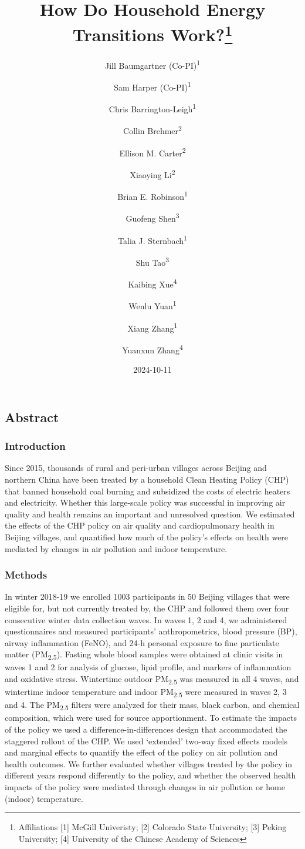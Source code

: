 \documentclass[
  letterpaper,
  DIV=11,
  numbers=noendperiod]{scrartcl}
\title{How Do Household Energy Transitions Work?\thanks{Affiliations
{[}1{]} McGill Univeristy; {[}2{]} Colorado State University; {[}3{]}
Peking University; {[}4{]} University of the Chinese Academy of
Sciences}}
\author{Jill Baumgartner (Co-PI)\textsuperscript{1} \and Sam Harper
(Co-PI)\textsuperscript{1} \and Chris
Barrington-Leigh\textsuperscript{1} \and Collin
Brehmer\textsuperscript{2} \and Ellison M.
Carter\textsuperscript{2} \and Xiaoying Li\textsuperscript{2} \and Brian
E. Robinson\textsuperscript{1} \and Guofeng
Shen\textsuperscript{3} \and Talia J.
Sternbach\textsuperscript{1} \and Shu
Tao\textsuperscript{3} \and Kaibing Xue\textsuperscript{4} \and Wenlu
Yuan\textsuperscript{1} \and Xiang Zhang\textsuperscript{1} \and Yuanxun
Zhang\textsuperscript{4}}
\date{2024-10-11}
\renewcommand*\contentsname{Table of contents}
\newcommand\contentsname{Table of contents}
\begin{document}
\maketitle

\renewcommand*\contentsname{Table of contents}
{
\hypersetup{linkcolor=}
\setcounter{tocdepth}{3}
\tableofcontents
}

\subsection*{Abstract}\label{abstract}

\subsubsection*{Introduction}\label{introduction}

Since 2015, thousands of rural and peri-urban villages across Beijing
and northern China have been treated by a household Clean Heating Policy
(CHP) that banned household coal burning and subsidized the costs of
electric heaters and electricity. Whether this large-scale policy was
successful in improving air quality and health remains an important and
unresolved question. We estimated the effects of the CHP policy on air
quality and cardiopulmonary health in Beijing villages, and quantified
how much of the policy's effects on health were mediated by changes in
air pollution and indoor temperature.

\subsubsection*{Methods}\label{methods}

In winter 2018-19 we enrolled 1003 participants in 50 Beijing villages
that were eligible for, but not currently treated by, the CHP and
followed them over four consecutive winter data collection waves. In
waves 1, 2 and 4, we administered questionnaires and measured
participants' anthropometrics, blood pressure (BP), airway inflammation
(FeNO), and 24-h personal exposure to fine particulate matter
(PM\textsubscript{2.5}). Fasting whole blood samples were obtained at
clinic visits in waves 1 and 2 for analysis of glucose, lipid profile,
and markers of inflammation and oxidative stress. Wintertime outdoor
PM\textsubscript{2.5} was measured in all 4 waves, and wintertime indoor
temperature and indoor PM\textsubscript{2.5} were measured in waves 2, 3
and 4. The PM\textsubscript{2.5} filters were analyzed for their mass,
black carbon, and chemical composition, which were used for source
apportionment. To estimate the impacts of the policy we used a
difference-in-differences design that accommodated the staggered rollout
of the CHP. We used `extended' two-way fixed effects models and marginal
effects to quantify the effect of the policy on air pollution and health
outcomes. We further evaluated whether villages treated by the policy in
different years respond differently to the policy, and whether the
observed health impacts of the policy were mediated through changes in
air pollution or home (indoor) temperature.
\end{document}
